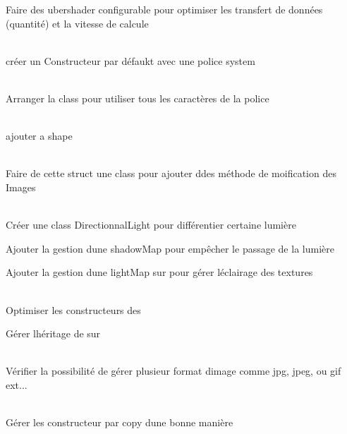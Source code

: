 \begin{DoxyRefList}
Faire des ubershader configurable pour optimiser les transfert de données (quantité) et la vitesse de calcule  
\item[Class \doxylink{classFont}{Font} ]\hfill \\
\label{todo__todo000006}%
%
créer un Constructeur par défaukt avec une police system  
\item[Member \doxylink{classFont_a41a7dca42ac0df85a27163dc9ace9de3}{Font\+::Font} (int glyph\+Size, const char \texorpdfstring{$\ast$}{*}ttf\+Path)]\hfill \\
\label{todo__todo000007}%
%
Arranger la class pour utiliser tous les caractères de la police  
\item[Class \doxylink{classGeometric}{Geometric} ]\hfill \\
\label{todo__todo000008}%
%
ajouter a shape  
\item[Struct \doxylink{structImage}{Image} ]\hfill \\
\label{todo__todo000012}%
%
Faire de cette struct une class pour ajouter ddes méthode de moification des Images  
\item[Class \doxylink{classLight}{Light} ]\hfill \\
\label{todo__todo000009}%
%
Créer une class Directionnal\+Light pour différentier certaine lumière 



Ajouter la gestion d\textquotesingle{}une shadow\+Map pour empêcher le passage de la lumière 



Ajouter la gestion d\textquotesingle{}une light\+Map sur  pour gérer l\textquotesingle{}éclairage des textures  
\item[Class \doxylink{classShape}{Shape} ]\hfill \\
\label{todo__todo000011}%
%
Optimiser les constructeurs des  



Gérer l\textquotesingle{}héritage de  sur   
\item[Class \doxylink{classTexture}{Texture} ]\hfill \\
\label{todo__todo000013}%
%
Vérifier la possibilité de gérer plusieur format d\textquotesingle{}image comme jpg, jpeg, ou gif ext...  
\item[Class \doxylink{classVector2}{Vector2\texorpdfstring{$<$}{<} T \texorpdfstring{$>$}{>}} ]\hfill \\
\label{todo__todo000004}%
%
Gérer les constructeur par copy d\textquotesingle{}une bonne manière 
\end{DoxyRefList}